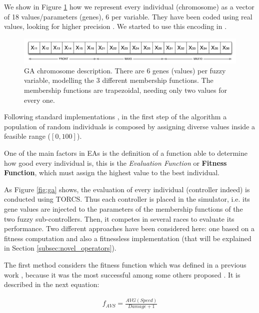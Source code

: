 \documentclass[10pt,journal,compsoc]{IEEEtran}
\begin{document}
We show in Figure \ref{fig:cromosome} how we represent every individual (chromosome) as a vector of 18 values/parameters (genes), 6 per variable. They have been coded using real values, looking for higher precision \cite{elsayed13}. We started to use this encoding in \cite{10.1007/978-3-319-77538-8_24}.

 \begin{figure}[!ht]	
 	\begin{center}
 		\includegraphics[width=12cm]{fig/chromosome2.png}
 		\caption{GA chromosome description. There are 6 genes
                  (values) per fuzzy variable, modelling the 3
                  different membership functions. The membership
                  functions are trapezoidal, needing only two values
                  for every one.}
 		\label{fig:cromosome}	
 	\end{center}	
 \end{figure}

Following standard implementations \cite{GAs_Goldberg89}, in the first step of the algorithm \cite{salem_evo17} a population of random individuals is composed by assigning diverse values inside a feasible range ($[0,100]$).

One of the main factors in EAs is the definition of a function able to determine how good every individual is, this is the \textit{Evaluation Function} or \textbf{Fitness Function}, which must assign the highest value to the best individual.

As Figure \ref{fig:ga} shows, the evaluation of every individual (controller indeed) is conducted using TORCS. Thus each controller is placed in the simulator, i.e. its gene values are injected to the parameters of the membership functions of the two fuzzy sub-controllers. Then, it competes in several races to evaluate its performance.
Two different approaches have been considered here: one based on a fitness computation and also a fitnessless implementation (that will be explained in Section \ref{subsec:novel_operators}).

The first method considers the fitness function which was defined in a previous work \cite{salem_cig2018}, because it was the most successful among some others proposed \cite{salem_evo18}. It is described in the next equation:

 \begin{equation} \label{fit_avg}
 	\begin{array}{lll}
 		f_{AVS}= \frac{AVG(Speed)}{Damage+1}
 	\end{array}
 \end{equation}	
\end{document}
